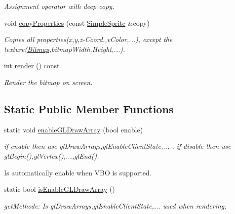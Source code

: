 \begin{DoxyCompactItemize}
\begin{DoxyCompactList}\small\item\em Assignment operator with deep copy. \item\end{DoxyCompactList}\item 
void \hyperlink{class_f2_c_1_1_simple_sprite_a1aa8944250c186b4a88c7bf7850fbb67}{copyProperties} (const \hyperlink{class_f2_c_1_1_simple_sprite}{SimpleSprite} \&copy)
\begin{DoxyCompactList}\small\item\em Copies all properties(x,y,z-\/Coord.,vColor,...), except the texture(\hyperlink{class_f2_c_1_1_bitmap}{Bitmap},bitmapWidth,Height,...). \item\end{DoxyCompactList}\item 
int \hyperlink{class_f2_c_1_1_simple_sprite_a94d58e6e46796a7352486817d51a1c3f}{render} () const 
\begin{DoxyCompactList}\small\item\em Render the bitmap on screen. \item\end{DoxyCompactList}\end{DoxyCompactItemize}
\subsection*{Static Public Member Functions}
\begin{DoxyCompactItemize}
\item 
static void \hyperlink{class_f2_c_1_1_simple_sprite_ab510ea2848e74b70bbd7a4bca33e4814}{enableGLDrawArray} (bool enable)
\begin{DoxyCompactList}\small\item\em if enable then use glDrawArrays,glEnableClientState,... , if disable then use glBegin(),glVertex(),...,glEnd(). \par
 Is automatically enable when VBO is supported. \item\end{DoxyCompactList}\item 
\hypertarget{class_f2_c_1_1_simple_sprite_abfde88fedfe88bdf7e4f7d9caa7bfed5}{
static bool \hyperlink{class_f2_c_1_1_simple_sprite_abfde88fedfe88bdf7e4f7d9caa7bfed5}{isEnableGLDrawArray} ()}
\label{class_f2_c_1_1_simple_sprite_abfde88fedfe88bdf7e4f7d9caa7bfed5}

\begin{DoxyCompactList}\small\item\em getMethode: Is glDrawArrays,glEnableClientState,... used when rendering. \item\end{DoxyCompactList}\end{DoxyCompactItemize}
